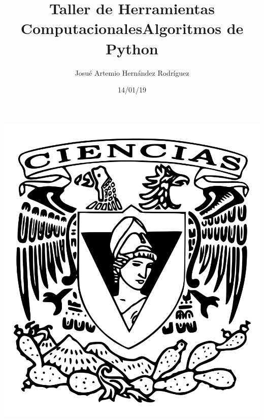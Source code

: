 \documentclass[letterpaper, 12pt, oneside]{article}%
\title{\Huge Taller de Herramientas Computacionales}
\author{Josué Artemio Hernández Rodríguez}%
\date{14/01/19}%
\begin{document}
\maketitle
\begin{center}%
\includegraphics[scale=0.2]{2.png}%
\end{center}%
\newpage%

\title{\Huge Algoritmos de Python\\}%
\end{document}
